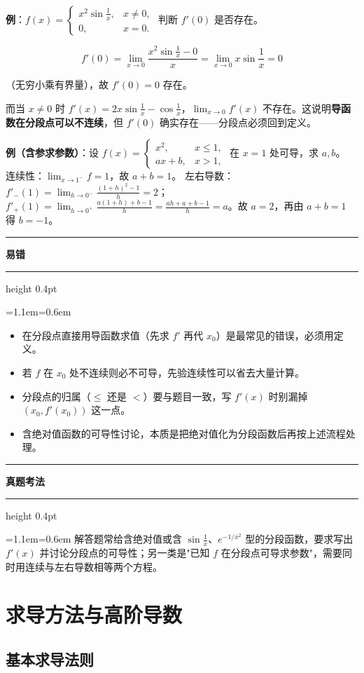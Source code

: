 \documentclass[11pt,openany,UTF8]{ctexbook}
\newcommand{\callouthead}[2]{%
  \par\addvspace{7pt}\noindent
  {\color{#1}\rule[-0.15em]{3pt}{1.05em}}\hspace{0.5em}%
  {\bfseries\color{#1}#2}\par\nobreak\vspace{-0.35em}%
  {\color{rulesep}\hrule height 0.4pt}\nobreak\vspace{0.45em}%
  \begingroup\small\setlength{\parindent}{0pt}%
  \leftskip=1.1em\rightskip=0.6em\noindent\ignorespaces}
\newcommand{\calloutend}{\par\endgroup\addvspace{7pt}}
\newenvironment{callwarn}[1]{\callouthead{warnbar}{#1}}{\calloutend}
\newenvironment{callexam}[1]{\callouthead{exambar}{#1}}{\calloutend}
\begin{document}
\textbf{例}：$f(x)=\begin{cases}x^2\sin\frac1x, & x\ne 0,\\ 0, & x=0.\end{cases}$ 判断 $f'(0)$ 是否存在。

\[f'(0)=\lim_{x\to 0}\frac{x^2\sin\frac1x-0}{x}=\lim_{x\to 0}x\sin\frac1x=0\]

（无穷小乘有界量），故 $f'(0)=0$ 存在。

而当 $x\ne0$ 时 $f'(x)=2x\sin\frac1x-\cos\frac1x$，$\lim_{x\to 0}f'(x)$ 不存在。这说明\textbf{导函数在分段点可以不连续}，但 $f'(0)$ 确实存在——分段点必须回到定义。

\textbf{例（含参求参数）}：设 $f(x)=\begin{cases}x^2, & x\le 1,\\ ax+b, & x>1,\end{cases}$ 在 $x=1$ 处可导，求 $a,b$。 连续性：$\lim_{x\to1^-}f=1$，故 $a+b=1$。 左右导数：$f'_-(1)=\lim_{h\to0^-}\frac{(1+h)^2-1}{h}=2$；$f'_+(1)=\lim_{h\to0^+}\frac{a(1+h)+b-1}{h}=\frac{ah+a+b-1}{h}=a$。故 $a=2$，再由 $a+b=1$ 得 $b=-1$。

\begin{callwarn}{易错}
\begin{itemize}
\item 在分段点直接用导函数求值（先求 $f'$ 再代 $x_0$）是最常见的错误，必须用定义。
\item 若 $f$ 在 $x_0$ 处不连续则必不可导，先验连续性可以省去大量计算。
\item 分段点的归属（$\le$ 还是 $<$）要与题目一致，写 $f'(x)$ 时别漏掉 $(x_0,f'(x_0))$ 这一点。
\item 含绝对值函数的可导性讨论，本质是把绝对值化为分段函数后再按上述流程处理。
\end{itemize}
\end{callwarn}

\begin{callexam}{真题考法}
解答题常给含绝对值或含 $\sin\frac1x$、$e^{-1/x^2}$ 型的分段函数，要求写出 $f'(x)$ 并讨论分段点的可导性；另一类是"已知 $f$ 在分段点可导求参数"，需要同时用连续与左右导数相等两个方程。

\end{callexam}

\section{求导方法与高阶导数}

\subsection{基本求导法则}
\end{document}
